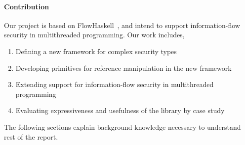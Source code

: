 \paragraph{Contribution}
Our project is based on FlowHaskell~\cite{Li:Zdancewic:CSFW}, 
and intend to support information-flow security in multithreaded programming. 
Our work includes,
\begin{enumerate}
\item Defining a new framework for complex security types
\item Developing primitives for reference manipulation in the new framework
\item Extending support for information-flow security in multithreaded 
programming
\item Evaluating expressiveness and usefulness of the library by case study 
\end{enumerate}

The following sections explain background knowledge
necessary to understand rest of the report.
